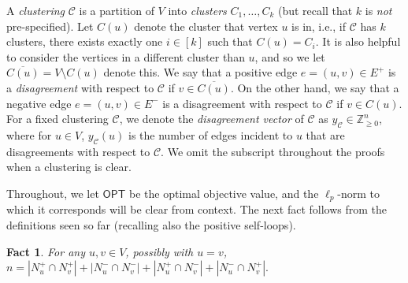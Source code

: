 \documentclass[11pt]{article}
\newtheorem{fact}{Fact}
\begin{document}
A \emph{clustering} $\mathcal{C}$ is a partition of $V$ into \emph{clusters} $C_1,\ldots,C_k$ (but recall that $k$ is \textit{not} pre-specified). 
Let $C(u)$ denote the cluster that vertex $u$ is in, i.e., if $\mathcal{C}$ has $k$ clusters, there exists exactly one $i \in [k]$ such that $C(u) = C_i$.
It is also helpful to consider the vertices in a different cluster than $u$, and so we let $\overline{C(u)} = V \setminus C(u)$ denote this.
We say that a positive edge $e=(u,v) \in E^+$ is a \emph{disagreement} with respect to $\mathcal{C}$ if $v \in \overline{C(u)}$. On the other hand, we say that a negative edge $e=(u,v) \in E^-$ is a disagreement with respect to $\mathcal{C}$ if $v \in C(u)$.
For a fixed clustering $\mathcal{C}$, we denote the \emph{disagreement vector} of $\mathcal{C}$ as $y_{\mathcal{C}} \in \mathbb{Z}_{\geq 0}^n$, where for $u \in V$, $y_{\mathcal{C}}(u)$ is the number of edges incident to $u$ that are disagreements with respect to $\mathcal{C}$. We omit the subscript throughout the proofs when a clustering is clear.

Throughout, we let $\textsf{OPT}$ be the optimal objective value, 
and the $\ell_p$-norm to which it corresponds will be clear from context.
The next fact follows from the definitions seen so far (recalling also the positive self-loops). 



\begin{fact} \label{pairwise_intersections}
For any $u,v \in V$, possibly with $u=v$, $n = |N_u^+ \cap N_v^+| + |N_u^- \cap N_v^-| + |N_u^+ \cap N_v^-| + |N_u^- \cap N_v^+|.$
\end{fact}
\end{document}
